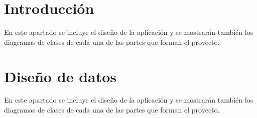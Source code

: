 \section{Introducción}\label{introducciondiseno}
En este apartado se incluye el diseño de la aplicación y se mostrarán también los diagramas de clases de cada una de las partes que forman el proyecto.

\section{Diseño de datos}\label{datos}

En este apartado se incluye el diseño de la aplicación y se mostrarán también los diagramas de clases de cada una de las partes que forman el proyecto.





